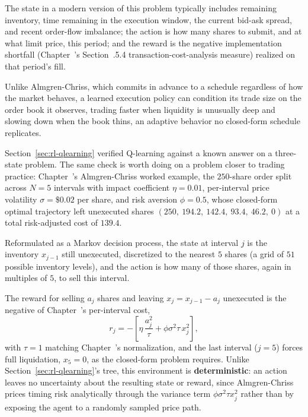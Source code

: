 \documentclass[../ai_in_finance]{subfiles}
\begin{document}
The state in a modern version of this problem typically includes remaining inventory, time remaining in the execution window, the current bid-ask spread, and recent order-flow imbalance; the action is how many shares to submit, and at what limit price, this period; and the reward is the negative implementation shortfall (Chapter~'s Section~.5.4 transaction-cost-analysis measure) realized on that period's fill.

Unlike Almgren-Chriss, which commits in advance to a schedule regardless of how the market behaves, a learned execution policy can condition its trade size on the order book it observes, trading faster when liquidity is unusually deep and slowing down when the book thins, an adaptive behavior no closed-form schedule replicates.

\label{sec:rl-execution-worked}

Section~\ref{sec:rl-qlearning} verified Q-learning against a known answer on a three-state problem. The same check is worth doing on a problem closer to trading practice: Chapter~'s Almgren-Chriss worked example, the $250$-share order split across $N=5$ intervals with impact coefficient $\eta=0.01$, per-interval price volatility $\sigma=\$0.02$ per share, and risk aversion $\phi=0.5$, whose closed-form optimal trajectory left unexecuted shares $(250,\ 194.2,\ 142.4,\ 93.4,\ 46.2,\ 0)$ at a total risk-adjusted cost of $139.4$.

Reformulated as a Markov decision process, the state at interval $j$ is the inventory $x_{j-1}$ still unexecuted, discretized to the nearest $5$ shares (a grid of $51$ possible inventory levels), and the action is how many of those shares, again in multiples of $5$, to sell this interval.

The reward for selling $a_j$ shares and leaving $x_j=x_{j-1}-a_j$ unexecuted is the negative of Chapter~'s per-interval cost,
\begin{equation*}
r_j = -\left[\eta\,\frac{a_j^2}{\tau} + \phi\sigma^2\tau\, x_j^2\right],
\end{equation*}
with $\tau=1$ matching Chapter~'s normalization, and the last interval ($j=5$) forces full liquidation, $x_5=0$, as the closed-form problem requires. Unlike Section~\ref{sec:rl-qlearning}'s tree, this environment is \textbf{deterministic}: an action leaves no uncertainty about the resulting state or reward, since Almgren-Chriss prices timing risk analytically through the variance term $\phi\sigma^2\tau x_j^2$ rather than by exposing the agent to a randomly sampled price path.
\end{document}
